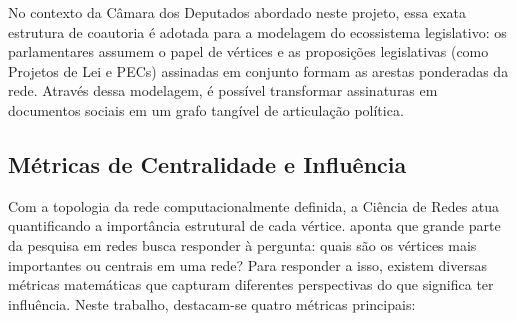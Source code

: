 \documentclass[
      12pt,
      a4paper,
      openright,
      oneside,
      chapter=TITLE,
      section=TITLE,
      english,
      french,
      spanish,
      brazilian
    ]{abntex2}
\begin{document}
    No contexto da Câmara dos Deputados abordado neste projeto, essa exata estrutura de coautoria é adotada para a modelagem do ecossistema legislativo: os parlamentares assumem o papel de vértices e as proposições legislativas (como Projetos de Lei e PECs) assinadas em conjunto formam as arestas ponderadas da rede. Através dessa modelagem, é possível transformar assinaturas em documentos sociais em um grafo tangível de articulação política.
    
    \subsection{Métricas de Centralidade e Influência}
    \label{subsec:metricas}
    
    Com a topologia da rede computacionalmente definida, a Ciência de Redes atua quantificando a importância estrutural de cada vértice.  aponta que grande parte da pesquisa em redes busca responder à pergunta: quais são os vértices mais importantes ou centrais em uma rede? Para responder a isso, existem diversas métricas matemáticas que capturam diferentes perspectivas do que significa ter influência. Neste trabalho, destacam-se quatro métricas principais:
    
\end{document}
